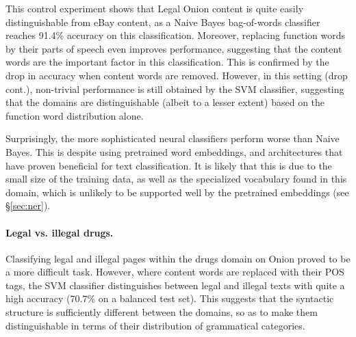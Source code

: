 \documentclass[11pt,a4paper,table]{article}
\begin{document}
This control experiment shows that Legal Onion content is quite easily
distinguishable from eBay content, as a Naive Bayes bag-of-words classifier
reaches 91.4\% accuracy on this classification.
Moreover, replacing function words by their parts of speech even improves
performance, suggesting that the content words are the important factor in this classification.
This is confirmed by the drop in accuracy when content words are removed.
However, in this setting (drop cont.), non-trivial performance is still
obtained by the SVM classifier, suggesting that the domains are distinguishable (albeit to a lesser extent)
based on the function word distribution alone.

Surprisingly, the more sophisticated neural classifiers perform worse than Naive Bayes.
This is despite using pretrained word embeddings,
and architectures that have proven beneficial for text classification.
It is likely that this is due to the small size of the training data, as well as the specialized
vocabulary found in this domain, which is unlikely to be supported well by the pretrained embeddings (see \S\ref{sec:ner}).



\paragraph{Legal vs. illegal drugs.}

Classifying legal and illegal pages within the drugs domain on Onion
proved to be a more difficult task.
However, where content words are replaced with their POS tags,
the SVM classifier distinguishes between legal and illegal texts with quite a high accuracy (70.7\% on a balanced test set).
This suggests that the syntactic structure is sufficiently different between the 
domains, so as to make them distinguishable in terms of their distribution of grammatical categories.
%
\end{document}
